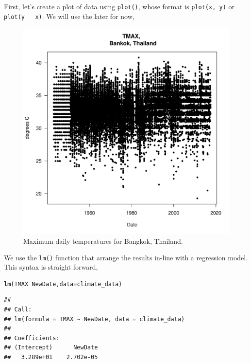 \documentclass{article}\usepackage[]{graphicx}\usepackage[]{color}
\makeatletter
\def\maxwidth{ %
  \ifdim\Gin@nat@width>\linewidth
    \linewidth
  \else
    \Gin@nat@width
  \fi
}
\newcommand{\hlopt}[1]{\textcolor[rgb]{0,0,0}{#1}}%
\newcommand{\hlstd}[1]{\textcolor[rgb]{0.345,0.345,0.345}{#1}}%
\newcommand{\hlkwc}[1]{\textcolor[rgb]{0.333,0.667,0.333}{#1}}%
\newcommand{\hlkwd}[1]{\textcolor[rgb]{0.737,0.353,0.396}{\textbf{#1}}}%
\newenvironment{kframe}{%
 \def\at@end@of@kframe{}%
 \ifinner\ifhmode%
  \def\at@end@of@kframe{\end{minipage}}%
  \begin{minipage}{\columnwidth}%
 \fi\fi%
 \def\FrameCommand##1{\hskip\@totalleftmargin \hskip-\fboxsep
 \colorbox{shadecolor}{##1}\hskip-\fboxsep
     \hskip-\linewidth \hskip-\@totalleftmargin \hskip\columnwidth}%
 \MakeFramed {\advance\hsize-\width
   \@totalleftmargin\z@ \linewidth\hsize
   \@setminipage}}%
 {\par\unskip\endMakeFramed%
 \at@end@of@kframe}
\newenvironment{knitrout}{}{} %
\makeatother
\begin{document}
First, let's create a plot of data using \texttt{plot()}, whose format is \texttt{plot(x, y)} or \texttt{plot(y ~ x)}. We will use the later for now, 

\begin{figure}
\label{fig:test12}
\caption{Maximum daily temperatures for Bangkok, Thailand.}
\begin{knitrout}
\color{fgcolor}
\includegraphics[width=\maxwidth]{figure/Tmaxplot-1} 

\end{knitrout}
\end{figure}

We use the \texttt{lm()} function that arrange the results in-line with a regression model. This syntax is straight forward,  

\begin{knitrout}
\color{fgcolor}\begin{kframe}
\begin{alltt}
\hlkwd{lm}\hlstd{(TMAX} \hlopt{~} \hlstd{NewDate,} \hlkwc{data}\hlstd{=climate_data)}
\end{alltt}
\begin{verbatim}
## 
## Call:
## lm(formula = TMAX ~ NewDate, data = climate_data)
## 
## Coefficients:
## (Intercept)      NewDate  
##   3.289e+01    2.702e-05
\end{verbatim}
\end{kframe}
\end{knitrout}
\end{document}
